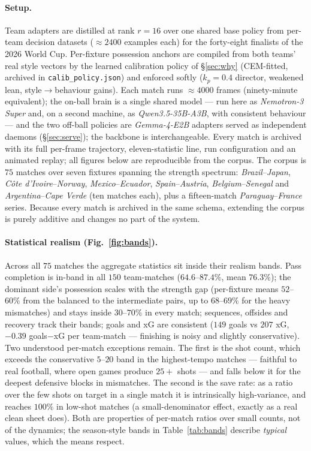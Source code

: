 \documentclass[11pt]{article}
\theoremstyle{definition}
\theoremstyle{remark}
\begin{document}
\paragraph{Setup.} Team adapters are distilled at rank $r=16$ over one shared base policy from per-team decision datasets ($\approx2400$ examples each) for the forty-eight finalists of the 2026 World Cup. Per-fixture possession anchors are compiled from both teams' real style vectors by the learned calibration policy of \S\ref{sec:why} (CEM-fitted, archived in \texttt{calib\_policy.json}) and enforced softly ($k_p=0.4$ director, weakened lean, style$\to$behaviour gains). Each match runs $\approx4000$ frames (ninety-minute equivalent); the on-ball brain is a single shared model --- run here as \emph{Nemotron-3 Super} and, on a second machine, as \emph{Qwen3.5-35B-A3B}, with consistent behaviour --- and the two off-ball policies are \emph{Gemma-4-E2B} adapters served as independent daemons (\S\ref{sec:serve}); the backbone is interchangeable. Every match is archived with its full per-frame trajectory, eleven-statistic line, run configuration and an animated replay; all figures below are reproducible from the corpus. The corpus is $75$ matches over seven fixtures spanning the strength spectrum: \emph{Brazil}--\emph{Japan}, \emph{C\^ote d'Ivoire}--\emph{Norway}, \emph{Mexico}--\emph{Ecuador}, \emph{Spain}--\emph{Austria}, \emph{Belgium}--\emph{Senegal} and \emph{Argentina}--\emph{Cape Verde} (ten matches each), plus a fifteen-match \emph{Paraguay}--\emph{France} series. Because every match is archived in the same schema, extending the corpus is purely additive and changes no part of the system.

\paragraph{Statistical realism (Fig.~\ref{fig:bands}).} Across all $75$ matches the aggregate statistics sit inside their realism bands. Pass completion is in-band in all $150$ team-matches ($64.6$--$87.4\%$, mean $76.3\%$); the dominant side's possession scales with the strength gap (per-fixture means $52$--$60\%$ from the balanced to the intermediate pairs, up to $68$--$69\%$ for the heavy mismatches) and stays inside $30$--$70\%$ in every match; sequences, offsides and recovery track their bands; goals and xG are consistent ($149$ goals vs $207$ xG, $-0.39$ goals$-$xG per team-match --- finishing is noisy and slightly conservative). Two understood per-match exceptions remain. The first is the shot count, which exceeds the conservative $5$--$20$ band in the highest-tempo matches --- faithful to real football, where open games produce $25+$ shots --- and falls below it for the deepest defensive blocks in mismatches. The second is the save rate: as a ratio over the few shots on target in a single match it is intrinsically high-variance, and reaches $100\%$ in low-shot matches (a small-denominator effect, exactly as a real clean sheet does). Both are properties of per-match ratios over small counts, not of the dynamics; the season-style bands in Table~\ref{tab:bands} describe \emph{typical} values, which the means respect.
\end{document}
